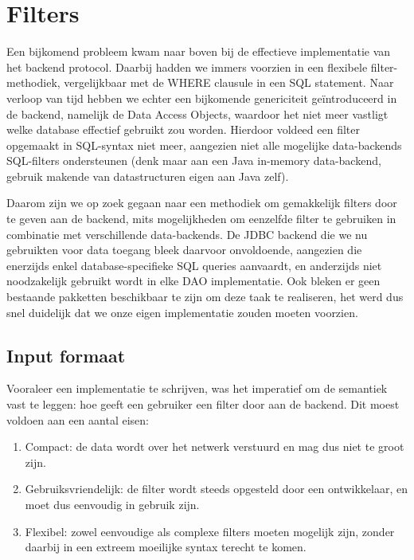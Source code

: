 \chapter{Filters}

Een bijkomend probleem kwam naar boven bij de effectieve implementatie van het backend protocol. Daarbij hadden we immers voorzien in een flexibele filter-methodiek, vergelijkbaar met de WHERE clausule in een SQL statement.
Naar verloop van tijd hebben we echter een bijkomende genericiteit ge\"introduceerd in de backend, namelijk de Data Access Objects, waardoor het niet meer vastligt welke database effectief gebruikt zou worden. Hierdoor voldeed een filter opgemaakt in SQL-syntax niet meer, aangezien niet alle mogelijke data-backends SQL-filters ondersteunen (denk maar aan een Java in-memory data-backend, gebruik makende van datastructuren eigen aan Java zelf).

Daarom zijn we op zoek gegaan naar een methodiek om gemakkelijk filters door te geven aan de backend, mits mogelijkheden om eenzelfde filter te gebruiken in combinatie met verschillende data-backends. De JDBC backend die we nu gebruikten voor data toegang bleek daarvoor onvoldoende, aangezien die enerzijds enkel database-specifieke SQL queries aanvaardt, en anderzijds niet noodzakelijk gebruikt wordt in elke DAO implementatie. Ook bleken er geen bestaande pakketten beschikbaar te zijn om deze taak te realiseren, het werd dus snel duidelijk dat we onze eigen implementatie zouden moeten voorzien.


\section{Input formaat}

Vooraleer een implementatie te schrijven, was het imperatief om de semantiek vast te leggen: hoe geeft een gebruiker een filter door aan de backend. Dit moest voldoen aan een aantal eisen:
\begin{enumerate}
\item Compact: de data wordt over het netwerk verstuurd en mag dus niet te groot zijn.
\item Gebruiksvriendelijk: de filter wordt steeds opgesteld door een ontwikkelaar, en moet dus eenvoudig in gebruik zijn.
\item Flexibel: zowel eenvoudige als complexe filters moeten mogelijk zijn, zonder daarbij in een extreem moeilijke syntax terecht te komen.
\end{enumerate}

